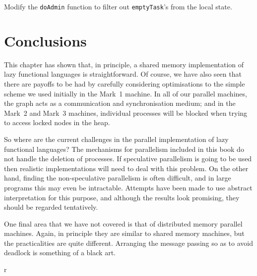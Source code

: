 \begin{exercise}\label{pgm:X:4:doAdmin}
Modify the \mbox{\tt doAdmin} function to filter out \mbox{\tt emptyTask}'s from the
local state.
\end{exercise}

\section{Conclusions}

This chapter has shown that, in principle, a shared memory
implementation of lazy functional languages is straightforward.  Of
course, we have also seen that there are payoffs to be had by carefully
considering optimisations to the simple scheme we used initially in
the Mark~1 machine.
In all of our parallel machines, the graph acts as a communication and
synchronisation medium; and in the Mark~2 and Mark~3 machines,
individual processes will be blocked when trying to access locked
nodes in the heap.

So where are the current challenges in the parallel implementation of
lazy functional languages?
The mechanisms for parallelism included in this book do not handle the
deletion of processes. If speculative parallelism is going to be used
then realistic implementations will need to deal with this problem.
On the other hand, finding the non-speculative parallelism is often
difficult, and in large programs this may even be intractable.
Attempts have been made to use abstract interpretation for this
purpose, and although the results look promising, they should be
regarded tentatively.

One final area that we have not covered is that of distributed memory
parallel machines. Again, in principle they are similar to shared
memory machines, but the practicalities are quite different.
Arranging the message passing so as to avoid deadlock is something of
a black art.

\theendnotes

r